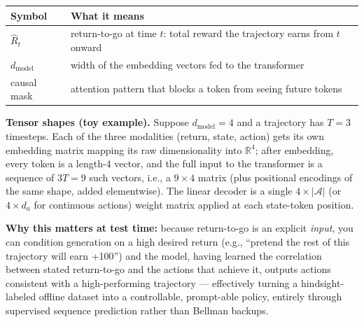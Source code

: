 \begin{center}
\begin{tabular}{@{}ll@{}}
\toprule
Symbol & What it means \\
\midrule
$\hat R_t$ & return-to-go at time $t$: total reward the trajectory earns from $t$ onward \\
$d_{\text{model}}$ & width of the embedding vectors fed to the transformer \\
causal mask & attention pattern that blocks a token from seeing future tokens \\
\bottomrule
\end{tabular}
\end{center}

\textbf{Tensor shapes (toy example).} Suppose $d_{\text{model}}=4$ and a trajectory has $T=3$ timesteps. Each of the three modalities (return, state, action) gets its own embedding matrix mapping its raw dimensionality into $\mathbb{R}^4$; after embedding, every token is a length-4 vector, and the full input to the transformer is a sequence of $3T = 9$ such vectors, i.e., a $9\times 4$ matrix (plus positional encodings of the same shape, added elementwise). The linear decoder is a single $4 \times |\mathcal{A}|$ (or $4\times d_a$ for continuous actions) weight matrix applied at each state-token position.

\textbf{Why this matters at test time:} because return-to-go is an explicit \emph{input}, you can condition generation on a high desired return (e.g., ``pretend the rest of this trajectory will earn +100'') and the model, having learned the correlation between stated return-to-go and the actions that achieve it, outputs actions consistent with a high-performing trajectory --- effectively turning a hindsight-labeled offline dataset into a controllable, prompt-able policy, entirely through supervised sequence prediction rather than Bellman backups.
